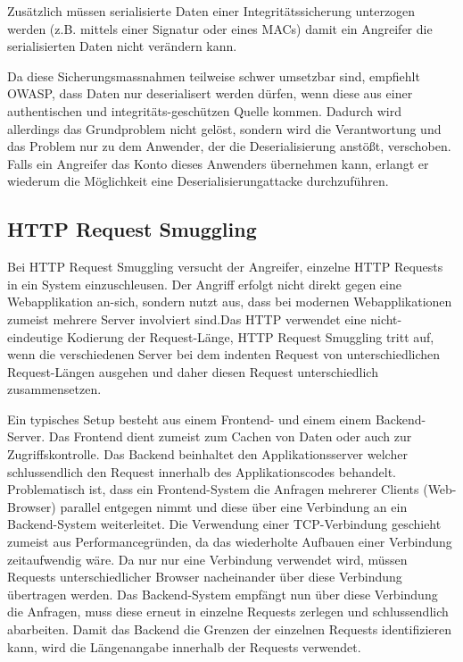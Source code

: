 Zusätzlich müssen serialisierte Daten einer Integritätssicherung unterzogen werden (z.B. mittels einer Signatur oder eines MACs) damit ein Angreifer die serialisierten Daten nicht verändern kann.

Da diese Sicherungsmassnahmen teilweise schwer umsetzbar sind, empfiehlt OWASP, dass Daten nur deserialisert werden dürfen, wenn diese aus einer authentischen und integritäts-geschützen Quelle kommen. Dadurch wird allerdings das Grundproblem nicht gelöst, sondern wird die Verantwortung und das Problem nur zu dem Anwender, der die Deserialisierung anstößt, verschoben. Falls ein Angreifer das Konto dieses Anwenders übernehmen kann, erlangt er wiederum die Möglichkeit eine Deserialisierungattacke durchzuführen.

\subsection{HTTP Request Smuggling}

Bei HTTP Request Smuggling versucht der Angreifer, einzelne HTTP Requests in ein System einzuschleusen. Der Angriff erfolgt nicht direkt gegen eine Webapplikation an-sich, sondern nutzt aus, dass bei modernen Webapplikationen zumeist mehrere Server involviert sind.Das HTTP verwendet eine nicht-eindeutige Kodierung der Request-Länge, HTTP Request Smuggling tritt auf, wenn die verschiedenen Server bei dem indenten Request von unterschiedlichen Request-Längen ausgehen und daher diesen Request unterschiedlich zusammensetzen.

Ein typisches Setup besteht aus einem Frontend- und einem einem Backend-Server. Das Frontend dient zumeist zum Cachen von Daten oder auch zur Zugriffskontrolle. Das Backend beinhaltet den Applikationsserver welcher schlussendlich den Request innerhalb des Applikationscodes behandelt. Problematisch ist, dass ein Frontend-System die Anfragen mehrerer Clients (Web-Browser) parallel entgegen nimmt und diese über eine Verbindung an ein Backend-System weiterleitet. Die Verwendung einer TCP-Verbindung geschieht zumeist aus Performancegründen, da das wiederholte Aufbauen einer Verbindung zeitaufwendig wäre. Da nur nur eine Verbindung verwendet wird, müssen Requests unterschiedlicher Browser nacheinander über diese Verbindung übertragen werden. Das Backend-System empfängt nun über diese Verbindung die Anfragen, muss diese erneut in einzelne Requests zerlegen und schlussendlich abarbeiten. Damit das Backend die Grenzen der einzelnen Requests identifizieren kann, wird die Längenangabe innerhalb der Requests verwendet.


